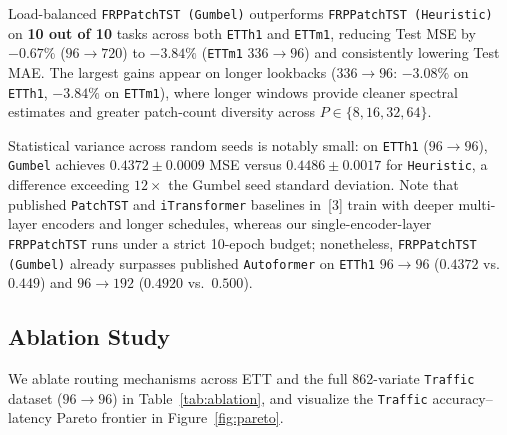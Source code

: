 \documentclass[11pt, letterpaper]{article}
\begin{document}
Load-balanced \texttt{FRPPatchTST (Gumbel)} outperforms \texttt{FRPPatchTST (Heuristic)} on \textbf{10 out of 10} tasks across both \texttt{ETTh1} and \texttt{ETTm1}, reducing Test MSE by $-0.67\%$ ($96\to720$) to $-3.84\%$ (\texttt{ETTm1} $336\to96$) and consistently lowering Test MAE. The largest gains appear on longer lookbacks ($336\to96$: $-3.08\%$ on \texttt{ETTh1}, $-3.84\%$ on \texttt{ETTm1}), where longer windows provide cleaner spectral estimates and greater patch-count diversity across $P \in \{8,16,32,64\}$.

Statistical variance across random seeds is notably small: on \texttt{ETTh1} ($96\to96$), \texttt{Gumbel} achieves $0.4372 \pm 0.0009$ MSE versus $0.4486 \pm 0.0017$ for \texttt{Heuristic}, a difference exceeding $12\times$ the Gumbel seed standard deviation. Note that published \texttt{PatchTST} and \texttt{iTransformer} baselines in~[3] train with deeper multi-layer encoders and longer schedules, whereas our single-encoder-layer \texttt{FRPPatchTST} runs under a strict 10-epoch budget; nonetheless, \texttt{FRPPatchTST (Gumbel)} already surpasses published \texttt{Autoformer} on \texttt{ETTh1} $96\to96$ ($0.4372$ vs.\ $0.449$) and $96\to192$ ($0.4920$ vs.\ $0.500$).

\subsection{Ablation Study}
We ablate routing mechanisms across ETT and the full 862-variate \texttt{Traffic} dataset ($96\to96$) in Table~\ref{tab:ablation}, and visualize the \texttt{Traffic} accuracy--latency Pareto frontier in Figure~\ref{fig:pareto}.
\end{document}
